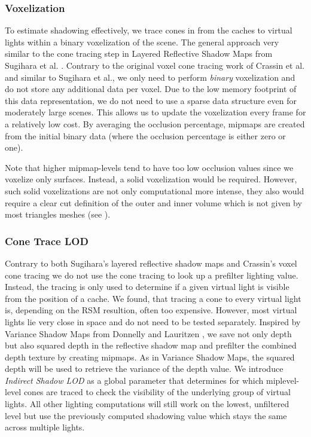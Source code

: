\documentclass[thesis.tex]{subfiles}
\begin{document}
\subsubsection{Voxelization}
To estimate shadowing effectively, we trace cones in from the caches to virtual lights within a binary voxelization of the scene.
The general approach very similar to the cone tracing step in \cite{bib:layeredrsm} Layered Reflective Shadow Maps from Sugihara et al. \cite{bib:layeredrsm}.
Contrary to the original voxel cone tracing work of Crassin et al. \cite{bib:voxelconetracing} and similar to Sugihara et al., we only need to perform \emph{binary} voxelization and do not store any additional data per voxel.
Due to the low memory footprint of this data representation, we do not need to use a sparse data structure even for moderately large scenes.
This allows us to update the voxelization every frame for a relatively low cost.
By averaging the occlusion percentage, mipmaps are created from the initial binary data (where the occlusion percentage is either zero or one).

Note that higher mipmap-levels tend to have too low occlusion values since we voxelize only surfaces.
Instead, a solid voxelization would be required.
However, such solid voxelizations are not only computational more intense, they also would require a clear cut definition of the outer and inner volume which is not given by most triangles meshes (see ).

\subsubsection{Cone Trace LOD}
Contrary to both Sugihara's layered reflective shadow maps and Crassin's voxel cone tracing we do not use the cone tracing to look up a prefilter lighting value.
Instead, the tracing is only used to determine if a given virtual light is visible from the position of a cache.
We found, that tracing a cone to every virtual light is, depending on the RSM resultion, often too expensive.
However, most virtual lights lie very close in space and do not need to be tested separately.
Inspired by Variance Shadow Maps from Donnelly and Lauritzen \cite{bib:vsm}, we save not only depth but also squared depth in the reflective shadow map and prefilter the combined depth texture by creating mipmaps.
As in Variance Shadow Maps, the squared depth will be used to retrieve the variance of the depth value.
We introduce \emph{Indirect Shadow LOD} as a global parameter that determines for which miplevel-level cones are traced to check the visibility of the underlying group of virtual lights. 
All other lighting computations will still work on the lowest, unfiltered level but use the previously computed shadowing value which stays the same across multiple lights.\\
\end{document}
